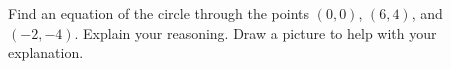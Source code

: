 \documentclass{ximera}
\begin{document}
\begin{question} \label{Qsdfl4345r3}
Find an equation of the circle through the points $(0,0)$, $(6,4)$, and $(-2,-4)$. Explain your reasoning. Draw a picture to help with your explanation.

\end{question}





\end{document}
